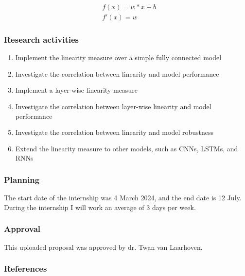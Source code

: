\documentclass[]{article}
\begin{document}
\begin{eqnarray*}
    &f(x) = w*x + b\\
    &f'(x) = w
\end{eqnarray*}

\subsubsection*{Research activities}
\begin{enumerate}
    \item Implement the linearity measure over a simple fully connected model
    \item Investigate the correlation between linearity and model performance
    \item Implement a layer-wise linearity measure
    \item Investigate the correlation between layer-wise linearity and model performance
    \item Investigate the correlation between linearity and model robustness
    \item Extend the linearity measure to other models, such as CNNs, LSTMs, and RNNs
\end{enumerate}

\subsubsection*{Planning}
The start date of the internship was 4 March 2024, and the end date is 12 July. During the internship I will work an average of 3 days per week. 

\subsubsection*{Approval}
This uploaded proposal was approved by dr. Twan van Laarhoven.

\subsubsection*{References}
\printbibliography[heading=none]
\end{document}
